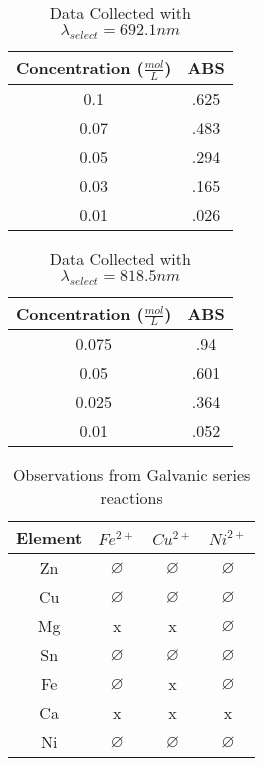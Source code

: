 \documentclass{article}
\begin{document}
    \begin{center}
        \begin{longtable}[c]{| c c |}
            \caption{Data Collected with $\lambda_{select} = 692.1 nm$ \label{long}}\\
            \hline
            Concentration ($\frac{mol}{L}$) & ABS\\
            \hline
            0.1  & .625\\
            0.07 & .483\\
            0.05 & .294\\
            0.03 & .165\\
            0.01 & .026\\
            \hline
        \end{longtable}
    \end{center}
    \begin{center}
        \begin{longtable}[c]{| c c |}
            \caption{Data Collected with $\lambda_{select} = 818.5 nm$ \label{long}}\\
            \hline
            Concentration ($\frac{mol}{L}$) & ABS\\
            \hline
            0.075 & .94\\
            0.05  & .601\\
            0.025 & .364\\
            0.01  & .052\\
            \hline
        \end{longtable}
    \end{center}

    \begin{center}
        \begin{longtable}[c]{| c c c c |}
            \caption{Observations from Galvanic series reactions \label{long}}\\
            \hline
            Element & $Fe^{2+}$ & $Cu^{2+}$ & $Ni^{2+}$\\
            \hline
            Zn & $\varnothing$ & $\varnothing$ & $\varnothing$ \\
            Cu & $\varnothing$ & $\varnothing$ & $\varnothing$\\
            Mg & x & x & $\varnothing$\\
            Sn & $\varnothing$ & $\varnothing$ & $\varnothing$\\
            Fe & $\varnothing$ & x & $\varnothing$\\
            Ca & x & x & x\\
            Ni & $\varnothing$ & $\varnothing$ & $\varnothing$\\
            \hline
        \end{longtable}
    \end{center}
\end{document}
